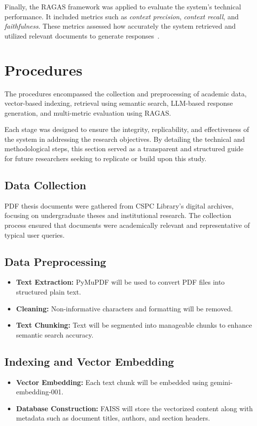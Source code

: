 \begin{refsection}
Finally, the RAGAS framework was applied to evaluate the system's technical performance. It included metrics such as \textit{context precision}, \textit{context recall}, and \textit{faithfulness}. These metrics assessed how accurately the system retrieved and utilized relevant documents to generate responses~\cite{holmes2023chatbot, ameli2024ranking, lin2024satisfaction}.

\section{Procedures}

The procedures encompassed the collection and preprocessing of academic data, vector-based indexing, retrieval using semantic search, LLM-based response generation, and multi-metric evaluation using RAGAS.

Each stage was designed to ensure the integrity, replicability, and effectiveness of the system in addressing the research objectives. By detailing the technical and methodological steps, this section served as a transparent and structured guide for future researchers seeking to replicate or build upon this study.

\subsection*{Data Collection}
PDF thesis documents were gathered from CSPC Library’s digital archives, focusing on undergraduate theses and institutional research. The collection process ensured that documents were academically relevant and representative of typical user queries.

\subsection*{Data Preprocessing}
\begin{itemize}
    \item \textbf{Text Extraction:} PyMuPDF will be used to convert PDF files into structured plain text.
    \item \textbf{Cleaning:} Non-informative characters and formatting will be removed.
    \item \textbf{Text Chunking:} Text will be segmented into manageable chunks to enhance semantic search accuracy.
\end{itemize}

\subsection*{Indexing and Vector Embedding}
\begin{itemize}
    \item \textbf{Vector Embedding:} Each text chunk will be embedded using gemini-embedding-001.
    \item \textbf{Database Construction:} FAISS will store the vectorized content along with metadata such as document titles, authors, and section headers.
\end{itemize}


\end{refsection}
